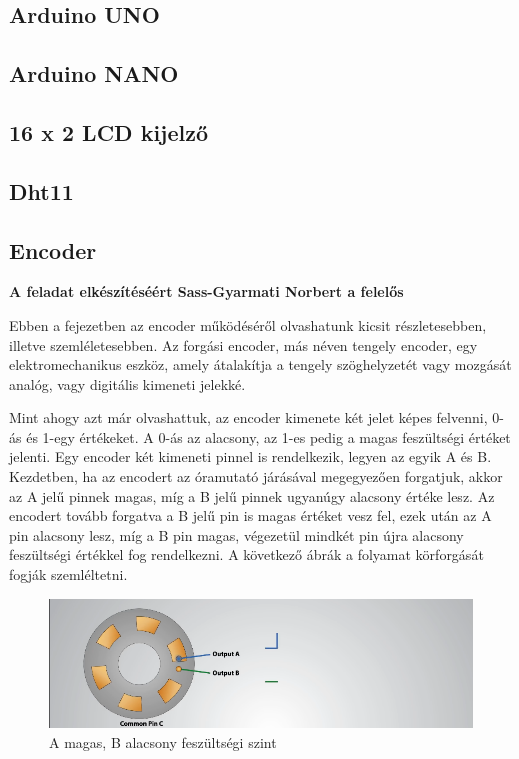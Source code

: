 \documentclass[
]{thesis-ekf}
\theoremstyle{definition}
\theoremstyle{remark}
\begin{document}
		\subsection{Arduino UNO}
		\subsection{Arduino NANO}
		\subsection{16 x 2 LCD kijelző}
		\subsection{Dht11}		
		\subsection{Encoder} \label{encoder}
			\par \textbf{A feladat elkészítéséért Sass-Gyarmati Norbert a felelős}
			\par Ebben a fejezetben az encoder működéséről olvashatunk kicsit részletesebben, illetve szemléletesebben. Az forgási encoder, más néven tengely encoder, egy elektromechanikus eszköz, amely átalakítja a tengely  szöghelyzetét vagy mozgását analóg, vagy digitális kimeneti jelekké.\cite{encoderwiki}
			\par Mint ahogy azt már olvashattuk, az encoder kimenete két jelet képes felvenni, 0-ás és 1-egy értékeket.  A 0-ás az alacsony, az 1-es pedig a magas feszültségi értéket jelenti. Egy encoder két kimeneti pinnel is rendelkezik, legyen az egyik A és B. Kezdetben, ha az encodert az óramutató járásával megegyezően forgatjuk, akkor az A jelű pinnek magas, míg a B jelű pinnek ugyanúgy alacsony értéke lesz. Az encodert tovább forgatva a B jelű pin is magas értéket vesz fel, ezek után az A pin alacsony lesz, míg a B pin magas, végezetül mindkét pin újra alacsony feszültségi értékkel fog rendelkezni. A következő ábrák a folyamat körforgását fogják szemléltetni.
			\begin{figure}[h]
				\centering
				\includegraphics[scale=0.50]{./images/firstenc}
				\caption{A magas, B alacsony feszültségi szint\cite{youtubeenc}}
				\label{fig:first}
			\end{figure}
\end{document}
